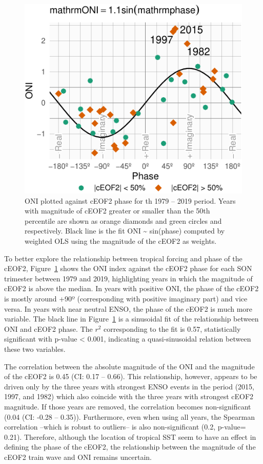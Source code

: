 \documentclass[smallextended]{svjour3}       %
\begin{document}
\begin{figure}
\centering
\includegraphics{../figures/enso-phase-1.pdf}
\caption{\label{fig:enso-phase}ONI plotted against cEOF2 phase for th 1979 -- 2019 period.
Years with magnitude of cEOF2 greater or smaller than the 50th percentile are shown as orange diamonds and green circles and respectively.
Black line is the fit ONI \textasciitilde{} sin(phase) computed by weighted OLS using the magnitude of the cEOF2 as weights.}
\end{figure}

To better explore the relationship between tropical forcing and phase of the cEOF2, Figure~\ref{fig:enso-phase} shows the ONI index against the cEOF2 phase for each SON trimester between 1979 and 2019, highlighting years in which the magnitude of cEOF2 is above the median.
In years with positive ONI, the phase of the cEOF2 is mostly around +90º (corresponding with positive imaginary part) and vice versa.
In years with near neutral ENSO, the phase of the cEOF2 is much more variable.
The black line in Figure~\ref{fig:enso-phase} is a sinusoidal fit of the relationship between ONI and cEOF2 phase.
The \(r^2\) corresponding to the fit is 0.57, statistically significant with p-value \textless{} 0.001, indicating a quasi-sinusoidal relation between these two variables.

The correlation between the absolute magnitude of the ONI and the magnitude of the cEOF2 is 0.45 (CI: 0.17 -- 0.66).
This relationship, however, appears to be driven only by the three years with strongest ENSO events in the period (2015, 1997, and 1982) which also coincide with the three years with strongest cEOF2 magnitude.
If those years are removed, the correlation becomes non-significant (0.04 (CI: -0.28 -- 0.35)).
Furthermore, even when using all years, the Spearman correlation --which is robust to outliers-- is also non-significant (0.2, p-value= 0.21).
Therefore, although the location of tropical SST seem to have an effect in defining the phase of the cEOF2, the relationship between the magnitude of the cEOF2 train wave and ONI remains uncertain.
\end{document}
